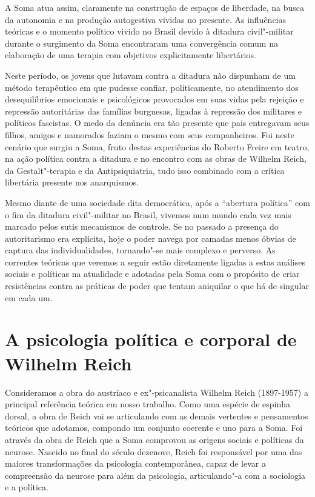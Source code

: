 A Soma atua assim, claramente na construção de espaços de liberdade, na
busca da autonomia e na produção autogestiva vividas no presente. As
influências teóricas e o momento político vivido no Brasil devido à
ditadura civil"-militar durante o surgimento da Soma encontraram uma
convergência comum na elaboração de uma terapia com objetivos
explicitamente libertários.

Neste período, os jovens que lutavam contra a ditadura não dispunham de
um método terapêutico em que pudesse confiar, politicamente, no
atendimento dos desequilíbrios emocionais e psicológicos provocados em
suas vidas pela rejeição e repressão autoritárias das famílias
burguesas, ligadas à repressão dos militares e políticos fascistas. O
medo da denúncia era tão presente que pais entregavam seus filhos,
amigos e namorados faziam o mesmo com seus companheiros. Foi neste
cenário que surgiu a Soma, fruto destas experiências do Roberto Freire
em teatro, na ação política contra a ditadura e no encontro com as obras
de Wilhelm Reich, da Gestalt"-terapia e da Antipsiquiatria, tudo isso
combinado com a crítica libertária presente nos anarquismos.

Mesmo diante de uma sociedade dita democrática, após a ``abertura
política'' com o fim da ditadura civil"-militar no Brasil, vivemos num
mundo cada vez mais marcado pelos sutis mecanismos de controle. Se no
passado a presença do autoritarismo era explícita, hoje o poder navega
por camadas menos óbvias de captura das individualidades, tornando"-se
mais complexo e perverso. As correntes teóricas que veremos a seguir
estão diretamente ligadas a estas análises sociais e políticas na
atualidade e adotadas pela Soma com o propósito de criar resistências
contra as práticas de poder que tentam aniquilar o que há de singular em
cada um.

\section{A psicologia política e corporal de Wilhelm Reich}

Consideramos a obra do austríaco e ex"-psicanalista Wilhelm Reich
(1897-1957) a principal referência teórica em nosso trabalho. Como uma
espécie de espinha dorsal, a obra de Reich vai se articulando com as
demais vertentes e pensamentos teóricos que adotamos, compondo um
conjunto coerente e uno para a Soma. Foi através da obra de Reich que a
Soma comprovou as origens sociais e políticas da neurose. Nascido no
final do século dezenove, Reich foi responsável por uma das maiores
transformações da psicologia contemporânea, capaz de levar a compreensão
da neurose para além da psicologia, articulando"-a com a sociologia e a
política.

